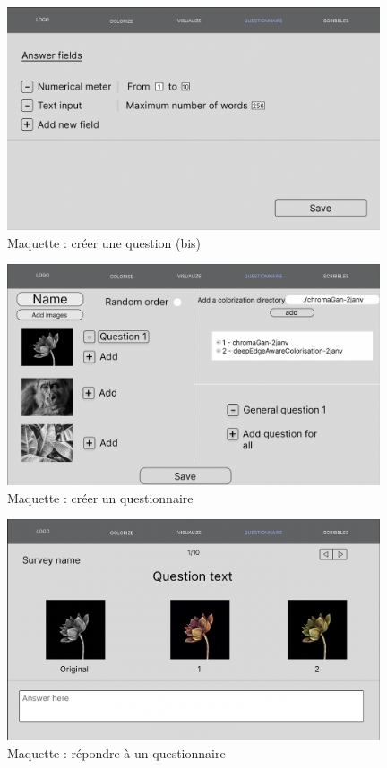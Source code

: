 \documentclass{article}
\begin{document}
\begin{figure}[htp]
    \centering
    \includegraphics[width=11cm]{questionnaire-creation-question2.png}
    \caption{Maquette : créer une question (bis)}
    \label{fig:maquette-questionnaire-creation-question2}
\end{figure}

\begin{figure}[htp]
    \centering
    \includegraphics[width=11cm]{questionnaire-creation.png}
    \caption{Maquette : créer un questionnaire}
    \label{fig:maquette-questionnaire-creation}
\end{figure}

\begin{figure}[htp]
    \centering
    \includegraphics[width=11cm]{questionnaire-repondre.png}
    \caption{Maquette : répondre à un questionnaire}
    \label{fig:maquette-questionnaire-repondre}
\end{figure}
\end{document}
